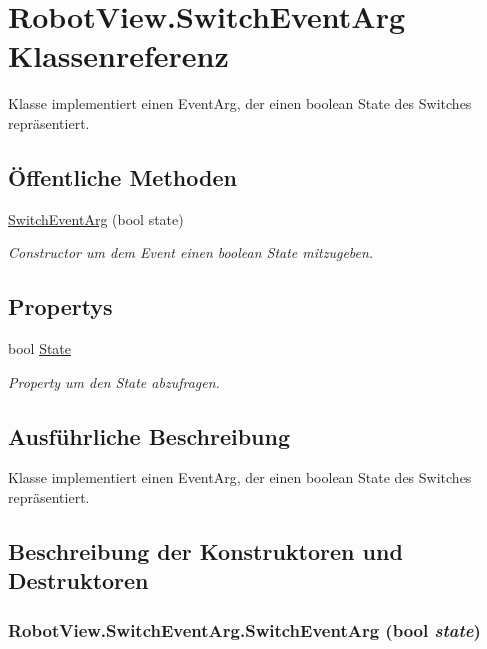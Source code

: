 \hypertarget{class_robot_view_1_1_switch_event_arg}{
\section{RobotView.SwitchEventArg Klassenreferenz}
\label{class_robot_view_1_1_switch_event_arg}
}


Klasse implementiert einen EventArg, der einen boolean State des Switches repräsentiert.  


\subsection*{Öffentliche Methoden}
\begin{DoxyCompactItemize}
\item 
\hyperlink{class_robot_view_1_1_switch_event_arg_a2112bc72be277bbfc8190aae7f65274e}{SwitchEventArg} (bool state)
\begin{DoxyCompactList}\small\item\em Constructor um dem Event einen boolean State mitzugeben. \item\end{DoxyCompactList}\end{DoxyCompactItemize}
\subsection*{Propertys}
\begin{DoxyCompactItemize}
\item 
bool \hyperlink{class_robot_view_1_1_switch_event_arg_a6c1441d3012ab67cbff2ffe52f3ad625}{State}
\begin{DoxyCompactList}\small\item\em Property um den State abzufragen. \item\end{DoxyCompactList}\end{DoxyCompactItemize}


\subsection{Ausführliche Beschreibung}
Klasse implementiert einen EventArg, der einen boolean State des Switches repräsentiert. 

\subsection{Beschreibung der Konstruktoren und Destruktoren}
\hypertarget{class_robot_view_1_1_switch_event_arg_a2112bc72be277bbfc8190aae7f65274e}{
\subsubsection[{SwitchEventArg}]{\setlength{\rightskip}{0pt plus 5cm}RobotView.SwitchEventArg.SwitchEventArg (bool {\em state})}}
\label{class_robot_view_1_1_switch_event_arg_a2112bc72be277bbfc8190aae7f65274e}


